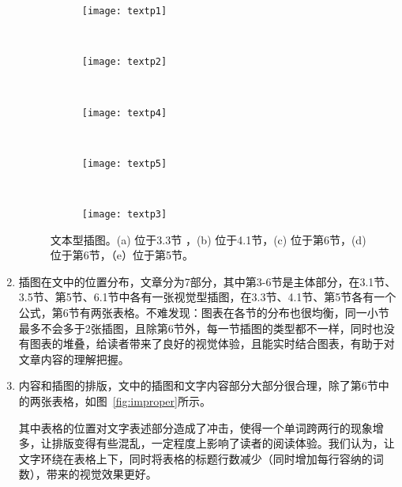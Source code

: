\begin{enumerate}
\begin{figure}[!htbp]
    \centering
    \begin{subfigure}[b]{0.35\textwidth}
      \texttt{[image: textp1]}
      \caption{}
      \label{fig:oaspl_a}
    \end{subfigure}%
    ~%
    \begin{subfigure}[b]{0.35\textwidth}
      \texttt{[image: textp2]}
      \caption{}
      \label{fig:oaspl_b}
    \end{subfigure}
    \\%
    \begin{subfigure}[b]{0.35\textwidth}
      \texttt{[image: textp4]}
      \caption{}
      \label{fig:oaspl_c}
    \end{subfigure}%
    ~%
    \begin{subfigure}[b]{0.35\textwidth}
      \texttt{[image: textp5]}
      \caption{}
      \label{fig:oaspl_d}
    \end{subfigure}
    ~%
    \begin{subfigure}[b]{0.35\textwidth}
      \texttt{[image: textp3]}
      \caption{}
      \label{fig:oaspl_d}
    \end{subfigure}
    \caption{文本型插图。(a) 位于3.3节 ，(b) 位于4.1节，(c) 位于第6节，(d) 位于第6节，（e）位于第5节。}
    \label{fig:textp}
\end{figure}

\item
插图在文中的位置分布，文章分为7部分，其中第3-6节是主体部分，在3.1节、3.5节、第5节、6.1节中各有一张视觉型插图，在3.3节、4.1节、第5节各有一个公式，第6节有两张表格。不难发现：图表在各节的分布也很均衡，同一小节最多不会多于2张插图，且除第6节外，每一节插图的类型都不一样，同时也没有图表的堆叠，给读者带来了良好的视觉体验，且能实时结合图表，有助于对文章内容的理解把握。
\item
内容和插图的排版，文中的插图和文字内容部分大部分很合理，除了第6节中的两张表格，如图~\ref{fig:improper}所示。

其中表格的位置对文字表述部分造成了冲击，使得一个单词跨两行的现象增多，让排版变得有些混乱，一定程度上影响了读者的阅读体验。我们认为，让文字环绕在表格上下，同时将表格的标题行数减少（同时增加每行容纳的词数），带来的视觉效果更好。
\end{enumerate}
